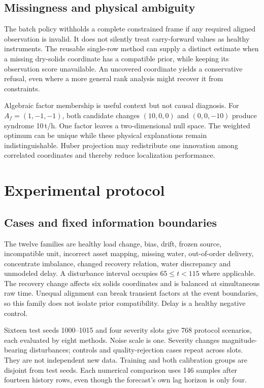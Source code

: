 \documentclass[11pt,a4paper]{article}
\begin{document}
\subsection{Missingness and physical ambiguity}
The batch policy withholds a complete constrained frame if any required aligned observation is invalid. It does not silently treat carry-forward values as healthy instruments. The reusable single-row method can supply a distinct estimate when a missing dry-solids coordinate has a compatible prior, while keeping its observation score unavailable. An uncovered coordinate yields a conservative refusal, even where a more general rank analysis might recover it from constraints.

Algebraic factor membership is useful context but not causal diagnosis. For $A_f=(1,-1,-1)$, both candidate changes $(10,0,0)$ and $(0,0,-10)$ produce syndrome 10\,t/h. One factor leaves a two-dimensional null space. The weighted optimum can be unique while these physical explanations remain indistinguishable. Huber projection may redistribute one innovation among correlated coordinates and thereby reduce localization performance.

\section{Experimental protocol}
\subsection{Cases and fixed information boundaries}
The twelve families are healthy load change, bias, drift, frozen source, incompatible unit, incorrect asset mapping, missing water, out-of-order delivery, concentrate imbalance, changed recovery relation, water discrepancy and unmodeled delay. A disturbance interval occupies $65\le t<115$ where applicable. The recovery change affects six solids coordinates and is balanced at simultaneous raw time. Unequal alignment can break transient factors at the event boundaries, so this family does not isolate prior compatibility. Delay is a healthy negative control.

Sixteen test seeds 1000--1015 and four severity slots give 768 protocol scenarios, each evaluated by eight methods. Noise scale is one. Severity changes magnitude-bearing disturbances; controls and quality-rejection cases repeat across slots. They are not independent new data. Training and both calibration groups are disjoint from test seeds. Each numerical comparison uses 146 samples after fourteen history rows, even though the forecast's own lag horizon is only four.
\end{document}
